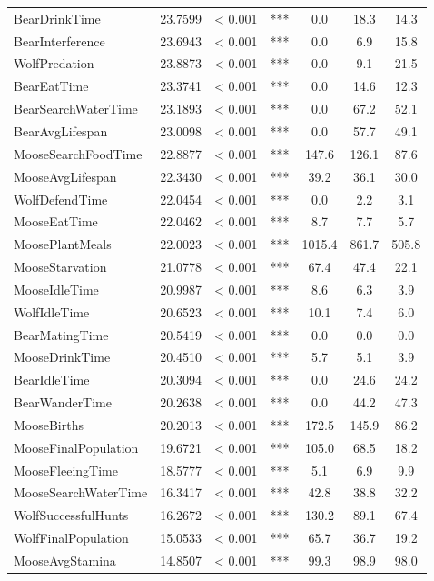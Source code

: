 \begin{longtable}[]{@{}lcccccc@{}}
BearDrinkTime & 23.7599 & < 0.001 & *** & 0.0 & 18.3 & 14.3 \\
BearInterference & 23.6943 & < 0.001 & *** & 0.0 & 6.9 & 15.8 \\
WolfPredation & 23.8873 & < 0.001 & *** & 0.0 & 9.1 & 21.5 \\
BearEatTime & 23.3741 & < 0.001 & *** & 0.0 & 14.6 & 12.3 \\
BearSearchWaterTime & 23.1893 & < 0.001 & *** & 0.0 & 67.2 & 52.1 \\
BearAvgLifespan & 23.0098 & < 0.001 & *** & 0.0 & 57.7 & 49.1 \\
MooseSearchFoodTime & 22.8877 & < 0.001 & *** & 147.6 & 126.1 & 87.6 \\
MooseAvgLifespan & 22.3430 & < 0.001 & *** & 39.2 & 36.1 & 30.0 \\
WolfDefendTime & 22.0454 & < 0.001 & *** & 0.0 & 2.2 & 3.1 \\
MooseEatTime & 22.0462 & < 0.001 & *** & 8.7 & 7.7 & 5.7 \\
MoosePlantMeals & 22.0023 & < 0.001 & *** & 1015.4 & 861.7 & 505.8 \\
MooseStarvation & 21.0778 & < 0.001 & *** & 67.4 & 47.4 & 22.1 \\
MooseIdleTime & 20.9987 & < 0.001 & *** & 8.6 & 6.3 & 3.9 \\
WolfIdleTime & 20.6523 & < 0.001 & *** & 10.1 & 7.4 & 6.0 \\
BearMatingTime & 20.5419 & < 0.001 & *** & 0.0 & 0.0 & 0.0 \\
MooseDrinkTime & 20.4510 & < 0.001 & *** & 5.7 & 5.1 & 3.9 \\
BearIdleTime & 20.3094 & < 0.001 & *** & 0.0 & 24.6 & 24.2 \\
BearWanderTime & 20.2638 & < 0.001 & *** & 0.0 & 44.2 & 47.3 \\
MooseBirths & 20.2013 & < 0.001 & *** & 172.5 & 145.9 & 86.2 \\
MooseFinalPopulation & 19.6721 & < 0.001 & *** & 105.0 & 68.5 & 18.2 \\
MooseFleeingTime & 18.5777 & < 0.001 & *** & 5.1 & 6.9 & 9.9 \\
MooseSearchWaterTime & 16.3417 & < 0.001 & *** & 42.8 & 38.8 & 32.2 \\
WolfSuccessfulHunts & 16.2672 & < 0.001 & *** & 130.2 & 89.1 & 67.4 \\
WolfFinalPopulation & 15.0533 & < 0.001 & *** & 65.7 & 36.7 & 19.2 \\
MooseAvgStamina & 14.8507 & < 0.001 & *** & 99.3 & 98.9 & 98.0 \\

\end{longtable}
